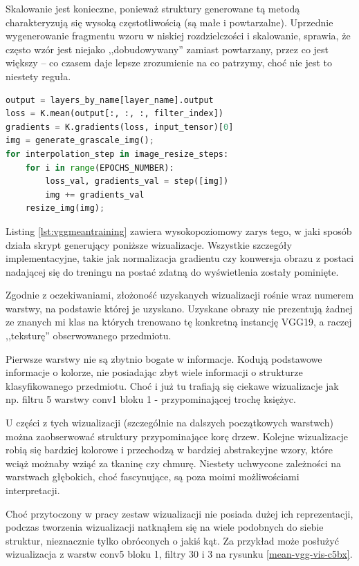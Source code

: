 Skalowanie jest konieczne, ponieważ struktury generowane tą metodą charakteryzują się wysoką częstotliwością (są małe i powtarzalne). Uprzednie wygenerowanie fragmentu wzoru w niskiej rozdzielczości i skalowanie, sprawia, że często wzór jest niejako ,,dobudowywany'' zamiast powtarzany, przez co jest większy -- co czasem daje lepsze zrozumienie na co patrzymy, choć nie jest to niestety reguła.

\begin{lstlisting}[language=Python, caption={Wizualizowanie poprzez maksymalizację mediany wybranej warstwy.}, label={lst:vggmeantraining}, captionpos=b]
output = layers_by_name[layer_name].output
loss = K.mean(output[:, :, :, filter_index])
gradients = K.gradients(loss, input_tensor)[0]
img = generate_grascale_img();
for interpolation_step in image_resize_steps:
    for i in range(EPOCHS_NUMBER):
        loss_val, gradients_val = step([img])
        img += gradients_val 
    resize_img(img);
\end{lstlisting}

Listing \ref{lst:vggmeantraining} zawiera wysokopoziomowy zarys tego, w jaki sposób działa skrypt generujący poniższe wizualizacje. Wszystkie szczegóły implementacyjne, takie jak normalizacja gradientu czy konwersja obrazu z postaci nadającej się do treningu na postać zdatną do wyświetlenia zostały pominięte.

Zgodnie z oczekiwaniami, złożoność uzyskanych wizualizacji rośnie wraz numerem warstwy, na podstawie której je uzyskano. Uzyskane obrazy nie prezentują żadnej ze znanych mi klas na których trenowano tę konkretną instancję VGG19, a raczej ,,teksturę'' obserwowanego przedmiotu.

Pierwsze warstwy nie są zbytnio bogate w informacje. Kodują podstawowe informacje o kolorze, nie posiadając zbyt wiele informacji o strukturze klasyfikowanego przedmiotu. Choć i już tu trafiają się ciekawe wizualizacje jak np. filtru 5 warstwy conv1 bloku 1 - przypominającej trochę księżyc. 

U części z tych wizualizacji (szczególnie na dalszych początkowych warstwch) można zaobserwować struktury przypominające korę drzew. Kolejne wizualizacje robią się bardziej kolorowe i przechodzą w bardziej abstrakcyjne wzory, które wciąż możnaby wziąć za tkaninę czy chmurę. Niestety uchwycone zależności na warstwach głębokich, choć fascynujące, są poza moimi możliwościami interpretacji.

Choć przytoczony w pracy zestaw wizualizacji nie posiada dużej ich reprezentacji, podczas tworzenia wizualizacji natknąłem się na wiele podobnych do siebie struktur, nieznacznie tylko obróconych o jakiś kąt. Za przykład może posłużyć wizualizacja z warstw conv5 bloku 1, filtry 30 i 3 na rysunku \ref{mean-vgg-vis-c5bx}.

